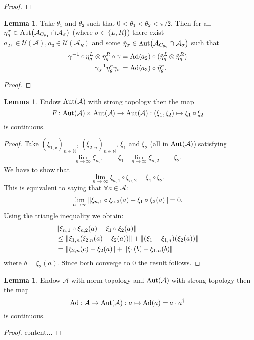 \documentclass[12pt,a4paper,twoside]{article}
\let\originalleft\left
\let\originalright\right
\renewcommand{\left}{\mathopen{}\mathclose\bgroup\originalleft}
\renewcommand{\right}{\aftergroup\egroup\originalright}
\newcommand{\UU}{\mathcal U}
\renewcommand{\AA}{\mathcal A}
\newcommand{\NN}{\mathbb{N}}
\newcommand{\Ad}[1]{\textrm{Ad}\left(#1\right)}
\newcommand{\Aut}[1]{\textrm{Aut}\left(#1\right)}
\theoremstyle{definition}
\newtheorem{lemma}[theorem]{Lemma}
\numberwithin{equation}{section}
\begin{document}
\begin{proof}
\end{proof}
\begin{lemma}\label{lem:TwoAngleLemmaPart2}
	Take $\theta_1$ and $\theta_2$ such that $0<\theta_1<\theta_2<\pi/2$. Then for all $\eta_{g}^{\sigma}\in\Aut{\AA_{C_{\theta_1}}\cap\AA_{\sigma}}$ (where $\sigma\in\{L,R\}$) there exist $a_2,\in\UU(\AA),a_3\in\UU(\AA_R)$ and some $\tilde{\eta}_{\sigma}\in \Aut{\AA_{C_{\theta_2}}\cap\AA_{\sigma}}$ such that
	\begin{align}
		\gamma^{-1}\circ\eta_{g}^L\otimes\eta_{g}^R\circ\gamma&=\Ad{a_2}\circ(\tilde\eta_{g}^L \otimes\tilde\eta_{g}^R)\\
		\gamma_\sigma^{-1}\eta_g^\sigma\gamma_\sigma&=\Ad{a_3}\circ \tilde\eta_{g}^\sigma.
	\end{align}
\end{lemma}
\begin{proof}
\end{proof}
\begin{lemma}\label{lem:AddingAutomorphismsIsContinuous}
	Endow $\Aut{\AA}$ with strong topology then the map
	\begin{equation}
		F:\Aut{\AA}\times\Aut{\AA}\rightarrow\Aut{\AA}:(\xi_1,\xi_2)\mapsto \xi_1\circ\xi_2
	\end{equation}
	is continuous.
\end{lemma}
\begin{proof}
	Take $(\xi_{1,n})_{n\in\NN}$, $(\xi_{2,n})_{n\in\NN}$, $\xi_1$ and $\xi_2$ (all in $\Aut{\AA}$) satisfying
	\begin{align}
		\lim_{n\rightarrow\infty}\xi_{n,1}&=\xi_1&\lim_{n\rightarrow\infty}\xi_{n,2}&=\xi_2.
	\end{align}
	We have to show that
	\begin{equation}
		\lim_{n\rightarrow\infty}\xi_{n,1}\circ\xi_{n,2}=\xi_1\circ\xi_2.
	\end{equation}
	This is equivalent to saying that $\forall a\in\AA:$
	\begin{equation}
		\lim_{n\rightarrow\infty}\norm{\xi_{n,1}\circ\xi_{n,2}(a)-\xi_1\circ\xi_2(a)}=0.
	\end{equation}
	Using the triangle inequality we obtain:
	\begin{align}
		&\norm{\xi_{n,1}\circ\xi_{n,2}(a)-\xi_1\circ\xi_2(a)}\\
		&\leq \norm{\xi_{1,n}\left(\xi_{2,n}(a)-\xi_{2}(a)\right)}+\norm{(\xi_1-\xi_{1,n})(\xi_2(a))}\\
		&=\norm{\xi_{2,n}(a)-\xi_{2}(a)}+\norm{\xi_1(b)-\xi_{1,n}(b)}
	\end{align}
	where $b=\xi_2(a).$ Since both converge to $0$ the result follows.
\end{proof}
\begin{lemma}\label{lem:AdjointIsContinuous}
	Endow $\AA$ with norm topology and $\Aut{\AA}$ with strong topology then the map
	\begin{equation}
		\text{Ad}:\AA\rightarrow \Aut{\AA}:a\mapsto \Ad{a}= a\cdot a^\dagger
	\end{equation}
	is continuous.
\end{lemma}
\begin{proof}
	content...
\end{proof}



\end{document}
